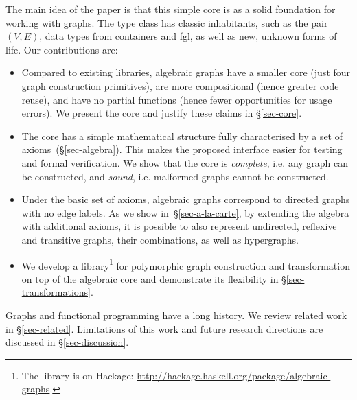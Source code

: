\noindent
The main idea of the paper is that this simple core is as a solid foundation for
working with graphs. The type class has classic inhabitants, such as the pair $(V,E)$,
data types from \textsf{containers} and \textsf{fgl}, as well as new, unknown forms
of life. Our contributions are:
\begin{itemize}
  \item Compared to existing libraries, algebraic graphs have a smaller
  core (just four graph construction primitives), are more compositional
  (hence greater code reuse), and have no partial functions (hence fewer
  opportunities for usage errors). We present the core and justify these claims
  in \S\ref{sec-core}.

  \item The core has a simple mathematical structure fully characterised
  by a set of axioms~(\S\ref{sec-algebra}). This makes the
  proposed interface easier for testing and formal verification. We show that
  the core is \emph{complete}, i.e. any graph can be constructed, and \emph{sound},
  i.e. malformed graphs cannot be constructed.

  \item Under the basic set of axioms, algebraic graphs correspond to directed
  graphs with no edge labels. As we show in~\S\ref{sec-a-la-carte}, by extending
  the algebra
  with additional axioms, it is possible to also represent undirected, reflexive
  and transitive graphs, their combinations, as well as hypergraphs.

  \item We develop a library\footnote{The library is on Hackage:
  \url{http://hackage.haskell.org/package/algebraic-graphs}.} for polymorphic graph
  construction and transformation on top of the algebraic core and
  demonstrate its flexibility in \S\ref{sec-transformations}.
\end{itemize}

Graphs and functional programming have a long history. We review related
work in \S\ref{sec-related}. Limitations of this work and future
research directions are discussed in \S\ref{sec-discussion}.
